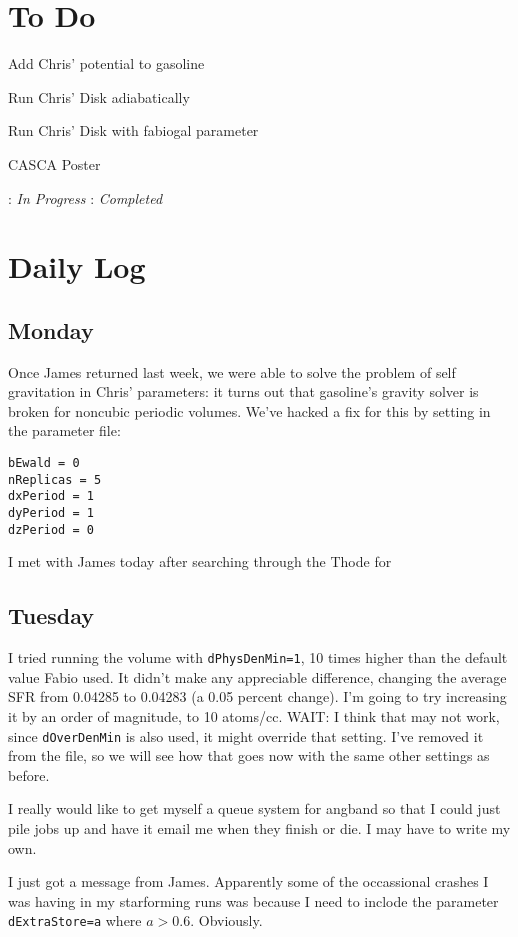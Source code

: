 \documentclass[11pt,letterpaper]{article}
\begin{document}
\section{To Do}
\begin{bullets}
\item[\checkmark] Add Chris' potential to gasoline
\item[\checkmark] Run Chris' Disk adiabatically
\item[\checkmark] Run Chris' Disk with fabiogal parameter
\item[\textleaf] CASCA Poster
\end{bullets}

\textleaf : \textit{In Progress} \qquad \checkmark : \textit{Completed}
\section{Daily Log}

\subsection{Monday}

Once James returned last week, we were able to solve the problem of self
gravitation in Chris' parameters: it turns out that gasoline's gravity
solver is broken for noncubic periodic volumes. We've hacked a fix for
this by setting in the parameter file:

\begin{verbatim}
bEwald = 0
nReplicas = 5
dxPeriod = 1
dyPeriod = 1
dzPeriod = 0
\end{verbatim}

I met with James today after searching through the Thode for

\subsection{Tuesday}

I tried running the volume with \texttt{dPhysDenMin=1}, 10 times higher
than the default value Fabio used. It didn't make any appreciable
difference, changing the average SFR from 0.04285 to 0.04283 (a 0.05
percent change). I'm going to try increasing it by an order of
magnitude, to 10 atoms/cc. WAIT: I think that may not work, since
\texttt{dOverDenMin} is also used, it might override that setting. I've
removed it from the file, so we will see how that goes now with the same
other settings as before.

I really would like to get myself a queue system for angband so that I
could just pile jobs up and have it email me when they finish or die. I
may have to write my own.

I just got a message from James. Apparently some of the occassional
crashes I was having in my starforming runs was because I need to
inclode the parameter \texttt{dExtraStore=a} where $a>0.6$. Obviously.
\end{document}
